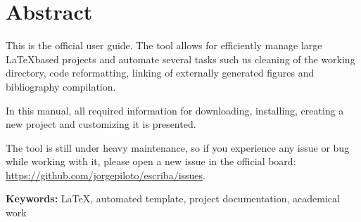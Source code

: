 \chapter*{Abstract}

This is the official \ESCRIBA user guide. The tool allows for efficiently manage
large \LaTeX based projects and automate several tasks such us cleaning of the
working directory, code reformatting, linking of externally generated figures
and bibliography compilation.

In this manual, all required information for downloading, installing, creating a
new project and customizing it is presented.

The tool is still under heavy maintenance, so if you experience any issue or bug
while working with it, please open a new issue in the official board:
\href{https://github.com/jorgepiloto/escriba/issues}{https://github.com/jorgepiloto/escriba/issues}.

\vspace{4cm}
\textbf{Keywords:} \LaTeX, automated template, project documentation, academical
work
